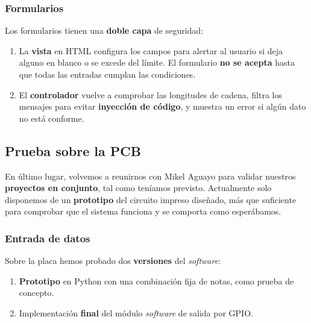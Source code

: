 \documentclass[10pt,a4paper]{article}
\begin{document}
	\subsubsection*{Formularios}
	
	Los formularios tienen una \textbf{doble capa} de seguridad:
	 
	\begin{enumerate}
		\item La \textbf{vista} en HTML configura los campos para alertar al usuario si deja alguno en blanco o se excede del límite. El formulario \textbf{no se acepta} hasta que todas las entradas cumplan las condiciones.
	 	
	 	\item El \textbf{controlador} vuelve a comprobar las longitudes de cadena, filtra los mensajes para evitar \textbf{inyección de código}, y muestra un error si algún dato no está conforme.
	\end{enumerate}
	
	\subsection{Prueba sobre la PCB}
	
	En último lugar, volvemos a reunirnos con Mikel Aguayo para validar nuestros \textbf{proyectos en conjunto}, tal como teníamos previsto. Actualmente solo disponemos de un \textbf{prototipo} del circuito impreso diseñado, más que suficiente para comprobar que el sistema funciona y se comporta como esperábamos.
	
	\subsubsection*{Entrada de datos}
	
	Sobre la placa hemos probado dos \textbf{versiones} del \textit{software}:
	
	\begin{enumerate}
		\item \textbf{Prototipo} en Python con una combinación fija de notas, como prueba de concepto.
		\item Implementación \textbf{final} del módulo \textit{software} de salida por GPIO.
	\end{enumerate}
	
\end{document}
